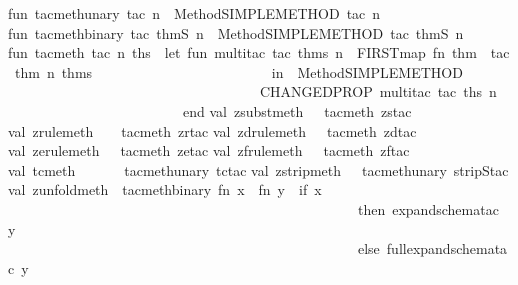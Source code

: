 \begin{isabellebody}
\isanewline
\isanewline
fun\ tac{}meth{\isacharunderscore}unary\ tac\ n\ {\isacharequal}\ Method{\isachardot}SIMPLE{\isacharunderscore}METHOD\ {\isacharparenleft}tac\ n{\isacharparenright}{\isacharsemicolon}\isanewline
fun\ tac{}meth{\isacharunderscore}binary\ tac\ thmS\ n\ {\isacharequal}\ Method{\isachardot}SIMPLE{\isacharunderscore}METHOD\ {\isacharparenleft}tac\ thmS\ n{\isacharparenright}{\isacharsemicolon}\isanewline
fun\ tac{}meth\ tac\ n\ ths\ {\isacharequal}\ let\ fun\ multitac\ tac\ thms\ n\ {\isacharequal}\ FIRST{\isacharparenleft}map\ {\isacharparenleft}fn\ thm\ {\isacharequal}{\isachargreater}\ tac\ thm\ n{\isacharparenright}\ thms{\isacharparenright}\isanewline
\ \ \ \ \ \ \ \ \ \ \ \ \ \ \ \ \ \ \ \ \ \ \ \ \ in\ \ Method{\isachardot}SIMPLE{\isacharunderscore}METHOD\ \isanewline
\ \ \ \ \ \ \ \ \ \ \ \ \ \ \ \ \ \ \ \ \ \ \ \ \ \ \ \ \ \ \ \ \ \ \ \ {\isacharparenleft}CHANGED{\isacharunderscore}PROP\ {\isacharparenleft}multitac\ tac\ ths\ n{\isacharparenright}{\isacharparenright}\isanewline
\ \ \ \ \ \ \ \ \ \ \ \ \ \ \ \ \ \ \ \ \ \ \ \ \ end{\isacharsemicolon}\isanewline
\isanewline
val\ zsubst{\isacharunderscore}meth\ \ {\isacharequal}\ tac{}meth\ zstac{\isacharsemicolon}\isanewline
val\ zrule{\isacharunderscore}meth\ \ \ {\isacharequal}\ tac{}meth\ zrtac{\isacharsemicolon}\isanewline
val\ zdrule{\isacharunderscore}meth\ \ {\isacharequal}\ tac{}meth\ zdtac{\isacharsemicolon}\isanewline
val\ zerule{\isacharunderscore}meth\ \ {\isacharequal}\ tac{}meth\ zetac{\isacharsemicolon}\isanewline
val\ zfrule{\isacharunderscore}meth\ \ {\isacharequal}\ tac{}meth\ zftac{\isacharsemicolon}\isanewline
val\ tc{\isacharunderscore}meth\ \ \ \ \ \ {\isacharequal}\ tac{}meth{\isacharunderscore}unary\ tc{\isacharunderscore}tac{\isacharsemicolon}\isanewline
val\ zstrip{\isacharunderscore}meth\ \ {\isacharequal}\ tac{}meth{\isacharunderscore}unary\ stripS{\isacharunderscore}tac{\isacharsemicolon}\isanewline
val\ zunfold{\isacharunderscore}meth\ {\isacharequal}\ tac{}meth{\isacharunderscore}binary\ {\isacharparenleft}fn\ x\ {\isacharequal}{\isachargreater}\ fn\ y\ {\isacharequal}{\isachargreater}\ if\ x\ {\isacharequal}\ {}\ \isanewline
\ \ \ \ \ \ \ \ \ \ \ \ \ \ \ \ \ \ \ \ \ \ \ \ \ \ \ \ \ \ \ \ \ \ \ \ \ \ \ \ \ \ \ \ \ \ \ \ \ \ then\ expand{\isacharunderscore}schema{\isacharunderscore}tac\ y\ {}\isanewline
\ \ \ \ \ \ \ \ \ \ \ \ \ \ \ \ \ \ \ \ \ \ \ \ \ \ \ \ \ \ \ \ \ \ \ \ \ \ \ \ \ \ \ \ \ \ \ \ \ \ else\ full{\isacharunderscore}expand{\isacharunderscore}schema{\isacharunderscore}tac\ y\ {}{\isacharparenright}\isanewline

\end{isabellebody}
